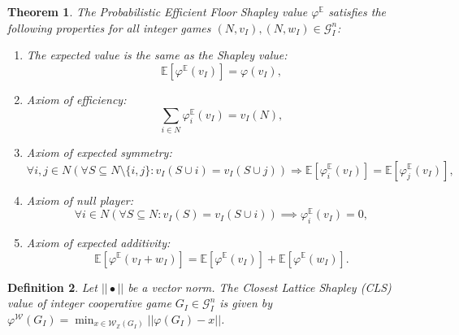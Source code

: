 \documentclass[12pt]{report}
\newcounter{theorem}
\newtheorem{definition}[theorem]{Definition}
\newtheorem{theorem}{Theorem}
\def\phi{\varphi}
\begin{document}
\begin{theorem}
    \label{theorem:probabilistic_efficient_floor_shapley_properties}
    The Probabilistic Efficient Floor Shapley value $\phi^{\mathbb{E}}$  satisfies the following properties for all integer games $(N,v_I),(N,w_I) \in \mathcal{G}_I^n$:
    \begin{enumerate}
        \item The expected value is the same as the Shapley value:
            \begin{displaymath}
                \label{eq:probabilistic_efficient_floor_shapley_properties:expected_value}
                \mathbb{E}[\phi^{\mathbb{E}}(v_I)] = \phi(v_I),
            \end{displaymath}
        \item Axiom of efficiency:
            \begin{displaymath}
                \sum_{i \in N}\phi_{i}^{\mathbb{E}}(v_I) = v_I(N),
            \end{displaymath}
        \item Axiom of expected symmetry:
            \begin{displaymath}
                \forall i,j \in N (\forall S \subseteq N \setminus \{i,j\}: v_I(S \cup i) = v_I(S \cup j)) \Rightarrow \mathbb{E}[\phi_{i}^{\mathbb{E}}(v_I)] = \mathbb{E}[\phi_{j}^{\mathbb{E}}(v_I)],
            \end{displaymath}
        \item Axiom of null player:
            \begin{displaymath}
                \forall i \in N(\forall S \subseteq N: v_I(S)=v_I(S \cup i)) \implies \phi_{i}^{\mathbb{E}}(v_I) = 0,
            \end{displaymath}
        \item Axiom of expected additivity:
            \begin{displaymath}
                \mathbb{E}[\phi^{\mathbb{E}}(v_I+w_I)] = \mathbb{E}[\phi^{\mathbb{E}}(v_I)] + \mathbb{E}[\phi^{\mathbb{E}}(w_I)].
            \end{displaymath}
    \end{enumerate}
\end{theorem}

\begin{definition}
    \label{def:CLS}
    Let $||\bullet||$ be a vector norm. The \emph{Closest Lattice Shapley (CLS)} value of integer cooperative game $G_I \in \mathcal{G}_I^n$ is given by
        $\phi^\mathcal{W}(G_I)  = \min_{x \in \mathcal{W}_\mathbb{Z}(G_I)} ||\phi(G_I) - x||$.

\end{definition}
\end{document}
